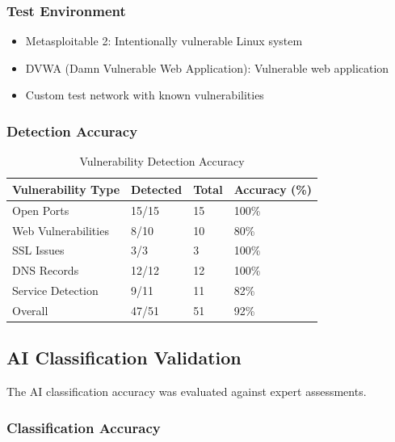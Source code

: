 \documentclass[12pt,a4paper]{report}
\begin{document}
\subsubsection{Test Environment}

\begin{itemize}
    \item Metasploitable 2: Intentionally vulnerable Linux system
    \item DVWA (Damn Vulnerable Web Application): Vulnerable web application
    \item Custom test network with known vulnerabilities
\end{itemize}

\subsubsection{Detection Accuracy}

\begin{table}[H]
    \centering
    \caption{Vulnerability Detection Accuracy}
    \label{tab:accuracy}
    \begin{tabular}{@{}llll@{}}
        \toprule
        Vulnerability Type & Detected & Total & Accuracy (\%) \\
        \midrule
        Open Ports & 15/15 & 15 & 100\% \\
        Web Vulnerabilities & 8/10 & 10 & 80\% \\
        SSL Issues & 3/3 & 3 & 100\% \\
        DNS Records & 12/12 & 12 & 100\% \\
        Service Detection & 9/11 & 11 & 82\% \\
        \midrule
        Overall & 47/51 & 51 & 92\% \\
        \bottomrule
    \end{tabular}
\end{table}

\subsection{AI Classification Validation}

The AI classification accuracy was evaluated against expert assessments.

\subsubsection{Classification Accuracy}
\end{document}
